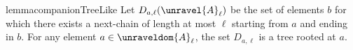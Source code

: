 \ifmainpart%
\begin{restatable}{lemma}{companionTreeLike}\label{lem:companion-tree-like}
  Let $D_{a, \ell}(\unravel{A}_{\ell})$ be the set of elements $b$ for which there exists a next-chain of length at most $\ell$ starting from $a$ and ending in $b$.
  For any element $a \in \unraveldom{A}_{\ell}$, the set $D_{a, \ell}$ is a tree rooted at $a$.
\end{restatable}
\fi
\ifmainpart
